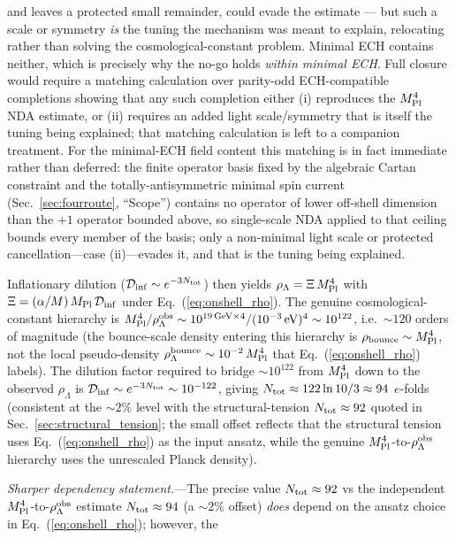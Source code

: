 \documentclass[aps,prd,twocolumn,superscriptaddress,showpacs,preprintnumbers,nofootinbib,longbibliography,floatfix]{revtex4-2}
\newcommand{\Dinf}{\mathcal{D}_{\rm inf}}
\newcommand{\MPl}{M_{\rm Pl}}
\begin{document}
and leaves a protected small remainder, could evade the estimate --- but such
a scale or symmetry \emph{is} the tuning the mechanism was meant to explain,
relocating rather than solving the cosmological-constant problem. Minimal ECH
contains neither, which is precisely why the no-go holds \emph{within minimal
ECH}. Full closure would require a matching calculation over parity-odd
ECH-compatible completions showing that any such completion either (i)
reproduces the $\MPl^{4}$ NDA estimate, or (ii) requires an added light
scale/symmetry that is itself the tuning being explained; that matching
calculation is left to a companion treatment.
For the minimal-ECH field content this matching is in fact immediate rather
than deferred: the finite operator basis fixed by the algebraic Cartan
constraint and the totally-antisymmetric minimal spin current
(Sec.~\ref{sec:fourroute}, ``Scope'') contains no operator of lower off-shell
dimension than the $+1$ operator bounded above, so single-scale NDA applied to
that ceiling bounds every member of the basis; only a non-minimal light scale
or protected cancellation---case (ii)---evades it, and that is the tuning being
explained.
\par
Inflationary dilution ($\Dinf\sim e^{-3N_{\rm tot}}$) then yields
$\rho_\Lambda = \Xi\,\MPl^4$ with $\Xi = (\alpha/M)\,\MPl\,\Dinf$ under
Eq.~(\ref{eq:onshell_rho}). The genuine cosmological-constant hierarchy is
$\MPl^4/\rho_\Lambda^{\rm obs}\sim 10^{19{\rm\,GeV}\times 4}/(10^{-3}\,\text{eV})^4
\sim 10^{122}$, i.e.\ $\sim 120$ orders of magnitude (the bounce-scale
density entering this hierarchy is $\rho_{\rm bounce}\sim\MPl^4$, not
the local pseudo-density $\rho_\Lambda^{\rm bounce}\sim 10^{-2}\,\MPl^4$
that Eq.~(\ref{eq:onshell_rho}) labels). The dilution factor required to bridge
$\sim 10^{122}$ from $\MPl^4$ down to the observed $\rho_\Lambda$ is
$\Dinf\sim e^{-3N_{\rm tot}}\sim 10^{-122}$, giving
$N_{\rm tot}\approx 122\ln 10/3 \approx 94$ $e$-folds (consistent at the
$\sim 2\%$ level with the structural-tension $N_{\rm tot}\approx 92$
quoted in Sec.~\ref{sec:structural_tension}; the small offset reflects
that the structural tension uses Eq.~(\ref{eq:onshell_rho}) as the
input ansatz, while the genuine $\MPl^4$-to-$\rho_\Lambda^{\rm obs}$
hierarchy uses the unrescaled Planck density).
\par
\textit{Sharper dependency statement.}---The precise value
$N_{\rm tot} \approx 92$ vs the independent $\MPl^4$-to-$\rho_\Lambda^{\rm obs}$
estimate $N_{\rm tot} \approx 94$ (a ${\sim}2\%$ offset) \emph{does}
depend on the ansatz choice in Eq.~(\ref{eq:onshell_rho}); however, the
\end{document}
